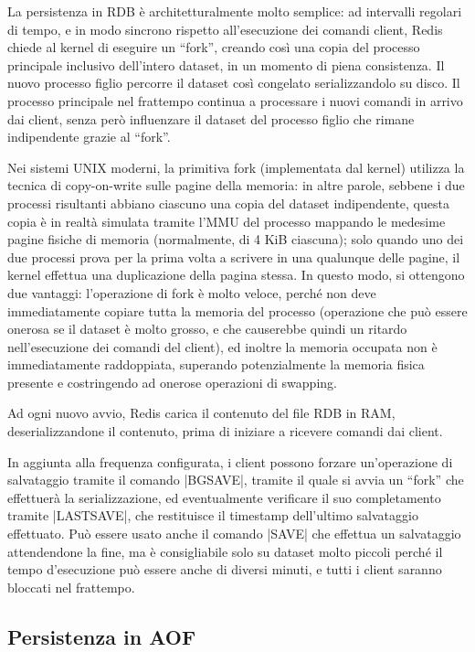 La persistenza in RDB è architetturalmente molto semplice: ad intervalli regolari di tempo, e in
modo sincrono rispetto all'esecuzione dei comandi client, Redis chiede al kernel di eseguire un
``fork'', creando così una copia del processo principale inclusivo dell'intero dataset, in un
momento di piena consistenza. Il nuovo processo figlio percorre il dataset così congelato
serializzandolo su disco. Il processo principale nel frattempo continua a processare i nuovi comandi
in arrivo dai client, senza però influenzare il dataset del processo figlio che rimane indipendente
grazie al ``fork''.

Nei sistemi UNIX moderni, la primitiva fork (implementata dal kernel) utilizza la tecnica di
copy-on-write sulle pagine della memoria: in altre parole, sebbene i due processi risultanti abbiano
ciascuno una copia del dataset indipendente, questa copia è in realtà simulata tramite l'MMU del
processo mappando le medesime pagine fisiche di memoria (normalmente, di 4 KiB ciascuna); solo
quando uno dei due processi prova per la prima volta a scrivere in una qualunque delle pagine, il
kernel effettua una duplicazione della pagina stessa. In questo modo, si ottengono due vantaggi:
l'operazione di fork è molto veloce, perché non deve immediatamente copiare tutta la memoria del
processo (operazione che può essere onerosa se il dataset è molto grosso, e che causerebbe quindi un
ritardo nell'esecuzione dei comandi del client), ed inoltre la memoria occupata non è immediatamente
raddoppiata, superando potenzialmente la memoria fisica presente e costringendo ad onerose
operazioni di swapping.

Ad ogni nuovo avvio, Redis carica il contenuto del file RDB in RAM, deserializzandone il contenuto,
prima di iniziare a ricevere comandi dai client.

In aggiunta alla frequenza configurata, i client possono forzare un'operazione di salvataggio 
tramite il comando \cverb|BGSAVE|, tramite il quale si avvia un ``fork'' che effettuerà la
serializzazione, ed eventualmente verificare il suo completamento tramite \cverb|LASTSAVE|, che
restituisce il timestamp dell'ultimo salvataggio effettuato. Può essere usato anche il comando
\cverb|SAVE| che effettua un salvataggio attendendone la fine, ma è consigliabile solo su dataset
molto piccoli perché il tempo d'esecuzione può essere anche di diversi minuti, e tutti i client
saranno bloccati nel frattempo.


\subsection{Persistenza in AOF}
\label{sec:durability:aof}

